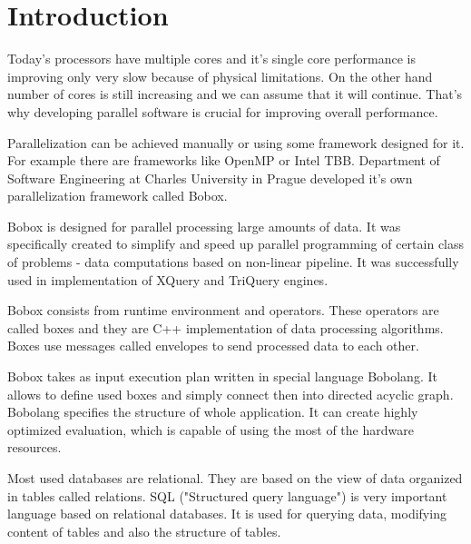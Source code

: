 \chapter{Introduction}
Today's processors have multiple cores and it's single core performance is improving only very slow because of physical limitations. On the other hand number of cores is still increasing and we can assume that it will continue. That's why developing parallel software is crucial for improving overall performance.

Parallelization can be achieved manually or using some framework designed for it. For example there are frameworks like OpenMP or Intel TBB. Department of Software Engineering at Charles University in Prague developed it's own parallelization framework called Bobox\cite{bobox}.

Bobox is designed for parallel processing large amounts of data. It was specifically created to simplify and speed up parallel programming of certain class of problems - data computations based on non-linear pipeline. It was successfully used in implementation of XQuery and TriQuery engines.

Bobox consists from runtime environment and operators. These operators are called boxes and they are C++ implementation of data processing algorithms. Boxes use messages called envelopes to send processed data to each other. 

Bobox takes as input execution plan written in special language Bobolang\cite{bobolang}. It allows to define used boxes and simply connect then into directed acyclic graph. Bobolang specifies the structure of whole application. It can create highly optimized evaluation, which is capable of using the most of the hardware resources.

Most used databases are relational. They are based on the view of data organized in tables called relations. SQL\cite{database} ("Structured query language") is very important language based on relational databases. It is used for querying data, modifying content of tables and also the structure of tables.

